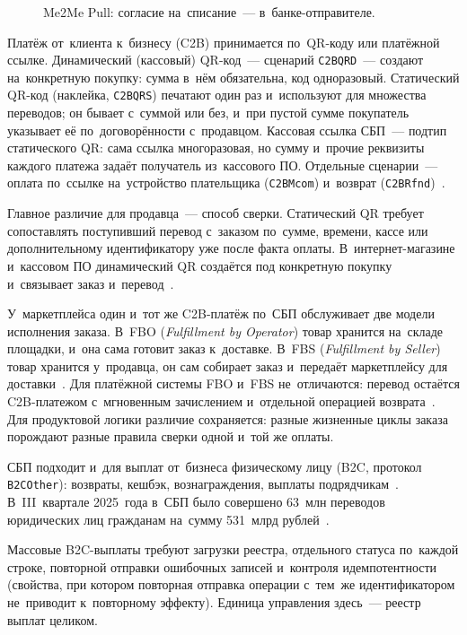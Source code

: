 \begin{figure}[tbp]
  \centering
  \caption{Me2Me Pull: согласие на~списание~--- в~банке-отправителе.}%
  \label{fig:sbp-me2me-pull-flow}
\end{figure}

Платёж от~клиента к~бизнесу (C2B) принимается по~QR-коду или платёжной ссылке.
Динамический (кассовый) QR-код~--- сценарий \texttt{C2BQRD}~--- создают
на~конкретную покупку: сумма в~нём обязательна, код одноразовый.
Статический QR-код (наклейка, \texttt{C2BQRS}) печатают один раз и~используют для
множества переводов; он бывает с~суммой или без, и~при пустой сумме покупатель
указывает её по~договорённости с~продавцом. Кассовая ссылка СБП~--- подтип
статического QR: сама ссылка многоразовая, но сумму и~прочие реквизиты каждого
платежа задаёт получатель из~кассового ПО. Отдельные сценарии~--- оплата
по~ссылке на~устройство плательщика (\texttt{C2BMcom}) и~возврат
(\texttt{C2BRfnd})~\cite{moneta-sbp-fields,sbp-faq-business}.

Главное различие для продавца~--- способ сверки. Статический QR требует
сопоставлять поступивший перевод с~заказом по~сумме, времени, кассе или
дополнительному идентификатору уже после факта оплаты. В~интернет-магазине
и~кассовом ПО динамический QR создаётся под конкретную покупку и~связывает
заказ и~перевод~\cite{sbp-faq-business}.

У~маркетплейса один и~тот же C2B-платёж по~СБП обслуживает две модели исполнения
заказа. В~FBO (\textit{Fulfillment by Operator}) товар хранится на~складе
площадки, и~она сама готовит заказ к~доставке. В~FBS (\textit{Fulfillment by
Seller}) товар хранится у~продавца, он сам собирает заказ и~передаёт
маркетплейсу для
доставки~\cite{ozon-warehouse-schemes,yandex-marketplace-models}. Для платёжной
системы FBO и~FBS не~отличаются: перевод остаётся C2B-платежом с~мгновенным
зачислением и~отдельной операцией возврата~\cite{sbp-faq-business}. Для
продуктовой логики различие сохраняется: разные жизненные циклы заказа порождают
разные правила сверки одной и~той же оплаты.

СБП подходит и~для выплат от~бизнеса физическому лицу (B2C, протокол
\texttt{B2COther}):
возвраты, кешбэк, вознаграждения, выплаты подрядчикам~\cite{moneta-sbp-fields}. В~III~квартале 2025~года в~СБП было
совершено 63~млн переводов юридических лиц гражданам на~сумму 531~млрд
рублей~\cite{cbr-sbp-metrics-2025q3}.

Массовые B2C-выплаты требуют загрузки реестра, отдельного статуса по~каждой
строке, повторной отправки ошибочных записей и~контроля идемпотентности
(свойства, при котором повторная отправка операции с~тем~же идентификатором
не~приводит к~повторному эффекту). Единица управления здесь~--- реестр выплат
целиком.

